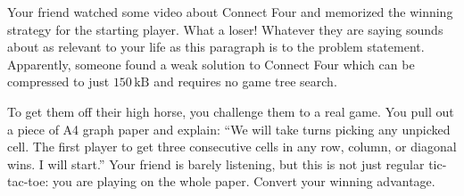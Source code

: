 




Your friend watched some video about Connect Four and memorized the winning
strategy for the starting player. What a loser!
Whatever they are saying sounds about as relevant to your life
as this paragraph is to the problem statement.
Apparently, someone found a weak solution to Connect Four which can be
compressed to just $150\,\textrm{kB}$ and requires no game tree search.

To get them off their high horse, you challenge them to a real game.
You pull out a piece of A4 graph paper and explain:
``We will take turns picking any unpicked cell.
The first player to get three consecutive cells in any row, column, or diagonal wins.
I will start.''
Your friend is barely listening, but this is not just regular tic-tac-toe:
you are playing on the whole paper.
Convert your winning advantage.


